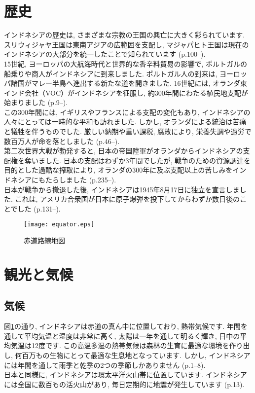 \documentclass[a4j, twocolumn]{jarticle}
\begin{document}
  \section{歴史}
  インドネシアの歴史は, さまざまな宗教の王国の興亡に大きく彩られています. スリウィジャヤ王国は東南アジアの広範囲を支配し, マジャパヒト王国は現在のインドネシアの大部分を統一したことで知られています\cite{kemdikbud2017sejarahX} (p.100--).\\
  15世紀, ヨーロッパの大航海時代と世界的な香辛料貿易の影響で, ポルトガルの船乗りや商人がインドネシアに到来しました. ポルトガル人の到来は, ヨーロッパ諸国がマレー半島へ進出する新たな道を開きました. 16世紀には, オランダ東インド会社（VOC）がインドネシアを征服し, 約300年間にわたる植民地支配が始まりました\cite{kemdikbud2017sejarahXI} (p.9--).\\
  この300年間には, イギリスやフランスによる支配の変化もあり, インドネシアの人々にとっては一時的な平和も訪れました. しかし, オランダによる統治は苦痛と犠牲を伴うものでした. 厳しい納期や重い課税, 腐敗により, 栄養失調や過労で数百万人が命を落としました\cite{kemdikbud2017sejarahXI} (p.46--).\\
  第二次世界大戦が勃発すると, 日本の帝国陸軍がオランダからインドネシアの支配権を奪いました. 日本の支配はわずか3年間でしたが, 戦争のための資源調達を目的とした過酷な搾取により, オランダの300年に及ぶ支配以上の苦しみをインドネシアにもたらしました\cite{kemdikbud2017sejarahXI} (p.235--). \\
  日本が戦争から撤退した後, インドネシアは1945年8月17日に独立を宣言しました. これは, アメリカ合衆国が日本に原子爆弾を投下してからわずか数日後のことでした\cite{safitry2021sejarah} (p.131--).

  \begin{figure}
    \centering
    \texttt{[image: equator.eps]}
    \caption{赤道路線地図}\label{equator}
  \end{figure}
  \section{観光と気候}
  \subsection{気候}
  図\ref{equator}の通り, インドネシアは赤道の真ん中に位置しており, 熱帯気候です. 年間を通して平均気温と湿度は非常に高く, 太陽は一年を通して明るく輝き, 日中の平均気温は12度です. この高温多湿の熱帯気候は森林の生育に最適な環境を作り出し, 何百万もの生物にとって最適な生息地となっています. しかし, インドネシアには年間を通して雨季と乾季の2つの季節しかありません\cite{handoyo2021geografi} (p.1--8).\\
  日本と同様に, インドネシアは環太平洋火山帯に位置しています. インドネシアには全国に数百もの活火山があり, 毎日定期的に地震が発生しています\cite{handoyo2021geografi} (p.13).\\
\end{document}
